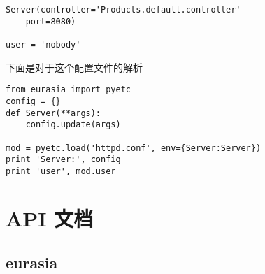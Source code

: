 \documentclass{manual}
\begin{document}
\begin{verbatim}
Server(controller='Products.default.controller'
	port=8080)

user = 'nobody'
\end{verbatim}

下面是对于这个配置文件的解析

\begin{verbatim}
from eurasia import pyetc
config = {}
def Server(**args):
	config.update(args)

mod = pyetc.load('httpd.conf', env={Server:Server})
print 'Server:', config
print 'user', mod.user
\end{verbatim}



\chapter{API 文档}

\section{eurasia}
\end{document}
